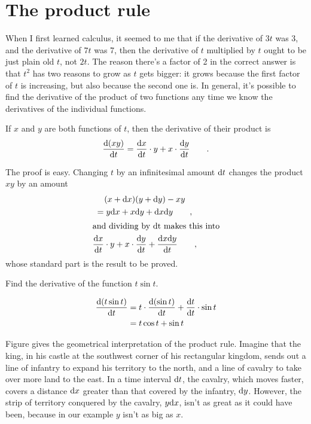 \section{The product rule}

When I first learned calculus, it seemed to me that if the derivative of $3t$ was $3$, and the derivative of
$7t$ was 7, then the derivative of $t$ multiplied by $t$ ought to be just plain old $t$, not $2t$. The reason there's
a factor of 2 in the correct answer is that $t^2$ has two reasons to grow as $t$ gets bigger: it grows because
the first factor of $t$ is increasing, but also because the second one is. In general, it's possible to find
the derivative of the product of two functions any time we know the derivatives of the individual functions.

\begin{important}
If $x$ and $y$ are both functions of $t$, then the derivative of their product is
\begin{equation*}
  \frac{\textup{d}(xy)}{\textup{d} t} = \frac{\textup{d} x}{\textup{d} t}\cdot y +  x \cdot \frac{\textup{d} y}{\textup{d} t} \qquad .
\end{equation*}
\end{important}

The proof is easy. Changing $t$ by an infinitesimal amount $\textup{d} t$ changes the product $xy$ by
an amount
\begin{gather*}
  (x+\textup{d} x)(y+\textup{d} y)-xy \\
      = y\textup{d} x + x\textup{d} y+\textup{d} x\textup{d} y \qquad , \\
\intertext{and dividing by \textup{d}t makes this into}
      \frac{\textup{d} x}{\textup{d} t}\cdot y +  x \cdot \frac{\textup{d} y}{\textup{d} t} + \frac{\textup{d} x \textup{d} y}{\textup{d} t} \qquad ,
\end{gather*}
whose standard part is the result to be proved.

\begin{eg}
\egquestion Find the derivative of the function $t\sin t$.

\eganswer
\begin{align*}
  \frac{\textup{d}(t\sin t)}{\textup{d} t} &= t\cdot \frac{\textup{d}(\sin t)}{\textup{d} t}+\frac{\textup{d} t}{\textup{d} t}\cdot\sin t \\
           &= t\cos t+\sin t
\end{align*}
\end{eg}

Figure  gives the geometrical interpretation of the product rule. Imagine that the king, in his castle
at the southwest corner of his rectangular kingdom, sends out a line of infantry to expand his territory
to the north, and a line of cavalry to take over more land to the east. In a time interval $\textup{d} t$,
the cavalry, which moves faster, covers a distance $\textup{d} x$ greater than that covered by the infantry,
$\textup{d} y$. However, the strip of territory conquered by the cavalry, $y \textup{d} x$, isn't as great as it could have been,
because in our example $y$ isn't as big as $x$.
%

